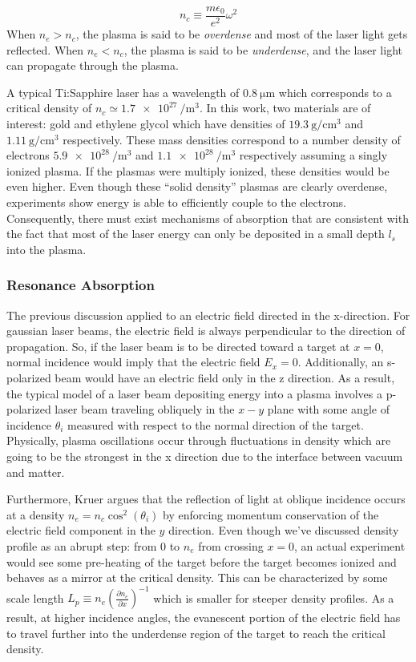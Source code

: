 \begin{equation}
	n_c \equiv \frac{m \epsilon_0}{e^2} \omega^2 \label{eq:criticaldensity}
\end{equation}
When $n_e > n_c$, the plasma is said to be \emph{overdense} and most of the laser light gets reflected. When $n_e < n_c$, the plasma is said to be \emph{underdense}, and the laser light can propagate through the plasma. 

A typical Ti:Sapphire laser has a wavelength of $\SI{0.8}{\micro \meter}$ which corresponds to a critical density of $n_c \simeq \SI{1.7e27}{\per \meter \cubed}$. In this work, two materials are of interest: gold and ethylene glycol which have densities of $\SI{19.3}{\gram \per \centi \meter \cubed}$ and $\SI{1.11}{\gram \per \centi \meter \cubed}$ respectively. These mass densities correspond to a number density of electrons $\SI{5.9e28}{\per \meter \cubed}$ and $\SI{1.1e28}{\per \meter \cubed}$ respectively assuming a singly ionized plasma. If the plasmas were multiply ionized, these densities would be even higher. Even though these ``solid density'' plasmas are clearly overdense, experiments show energy is able to efficiently couple to the electrons. Consequently, there must exist mechanisms of absorption that are consistent with the fact that most of the laser energy can only be deposited in a small depth $l_s$ into the plasma. 

\subsubsection{Resonance Absorption}
The previous discussion applied to an electric field directed in the x-direction. For gaussian laser beams, the electric field is always perpendicular to the direction of propagation. So, if the laser beam is to be directed toward a target at $x = 0$, normal incidence would imply that the electric field $E_x = 0$. Additionally, an s-polarized beam would have an electric field only in the z direction. As a result, the typical model of a laser beam depositing energy into a plasma involves a p-polarized laser beam traveling obliquely in the $x-y$ plane with some angle of incidence $\theta_i$ measured with respect to the normal direction of the target. Physically, plasma oscillations occur through fluctuations in density which are going to be the strongest in the x direction due to the interface between vacuum and matter.

Furthermore, Kruer\cite{Kruer_2003_Plasma} argues that the reflection of light at oblique incidence occurs at a density $n_e = n_c \cos^2(\theta_i)$ by enforcing momentum conservation of the electric field component in the $y$ direction. Even though we've discussed density profile as an abrupt step: from 0 to $n_e$ from crossing $x = 0$, an actual experiment would see some pre-heating of the target before the target becomes ionized and behaves as a mirror at the critical density. This can be characterized by some scale length $L_p \equiv n_e (\frac{\partial n_e}{\partial x})^{-1}$ which is smaller for steeper density profiles. As a result, at higher incidence angles, the evanescent portion of the electric field has to travel further into the underdense region of the target to reach the critical density. 

